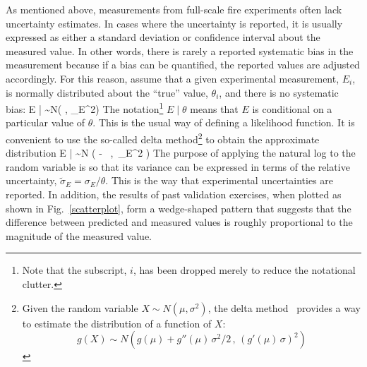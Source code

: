 As mentioned above, measurements from full-scale fire experiments often lack uncertainty estimates. In cases where the uncertainty is reported, it is usually expressed as either a standard deviation or confidence interval about the measured value. In other words, there is rarely a reported systematic bias in the measurement because if a bias can be quantified, the reported values are adjusted accordingly. For this reason, assume that a given experimental measurement, $E_i$, is normally distributed about the ``true'' value, $\theta_i$, and there is no systematic bias:
\be
   E \; | \; \theta \sim N(\theta \; , \; \sigma_E^2) \label{expunc}
\ee
The notation\footnote{Note that the subscript, $i$, has been dropped merely to reduce the notational clutter.} $E \; | \; \theta$ means that $E$ is conditional on a particular value of $\theta$. This is the usual way of defining a likelihood function. It is convenient to use the so-called delta method\footnote{Given the random variable $X \sim N(\mu,\sigma^2)$, the delta method~\cite{Oehlert:1992} provides a way to estimate the distribution of a function of $X$: \[g(X) \sim N \left( g(\mu) + g''(\mu) \, \sigma^2/2 \, , \, (g'(\mu) \, \sigma)^2\right)\]} to obtain the approximate distribution
\be
   \ln E \; | \; \theta \sim N \left( \ln \theta -  \, , \,\widetilde{\sigma}_E^2 \right) \label{eeq}
\ee
The purpose of applying the natural log to the random variable is so that its variance can be expressed in terms of the relative uncertainty, $\widetilde{\sigma}_E=\sigma_E/\theta$. This is the way that experimental uncertainties are reported. In addition, the results of past validation exercises, when plotted as shown in Fig.~\ref{scatterplot}, form a wedge-shaped pattern that suggests that the difference between predicted and measured values is roughly proportional to the magnitude of the measured value.


